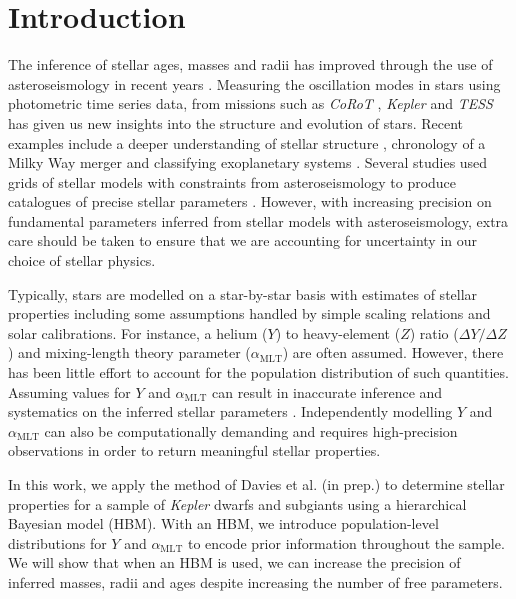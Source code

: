 \documentclass[a4paper,fleqn,usenatbib]{mnras}
\newcommand{\mlt}{\ensuremath{{\alpha_\mathrm{MLT}}}}
\begin{document}


\section{Introduction}

The inference of stellar ages, masses and radii has improved through the use of asteroseismology in recent years \citep[e.g. see the review by][]{Chaplin.Miglio2013}. Measuring the oscillation modes in stars using photometric time series data, from missions such as \emph{CoRoT} \citep{Baglin.Auvergne.ea2006}, \emph{Kepler} \citep{Borucki.Koch.ea2010} and \emph{TESS} \citep{Ricker.Winn.ea2015} has given us new insights into the structure and evolution of stars. Recent examples include a deeper understanding of stellar structure \citep{Verma.Raodeo.ea2017}, chronology of a Milky Way merger \citep{Chaplin.Serenelli.ea2020} and classifying exoplanetary systems \citep{Huber.Chaplin.ea2019}. Several studies used grids of stellar models with constraints from asteroseismology to produce catalogues of precise stellar parameters \citep{Pinsonneault.Elsworth.ea2014, SilvaAguirre.Lund.ea2017}. However, with increasing precision on fundamental parameters inferred from stellar models with asteroseismology, extra care should be taken to ensure that we are accounting for uncertainty in our choice of stellar physics.

Typically, stars are modelled on a star-by-star basis with estimates of stellar properties including some assumptions handled by simple scaling relations and solar calibrations. %
For instance, a helium ($Y$) to heavy-element ($Z$) ratio ($\Delta Y / \Delta Z$) and mixing-length theory parameter ($\mlt$) are often assumed. However, there has been little effort to account for the population distribution of such quantities. Assuming values for $Y$ and $\mlt$ can result in inaccurate inference and systematics on the inferred stellar parameters \citep{Valle.DellOmodarme.ea2015}. Independently modelling $Y$ and $\mlt$ can also be computationally demanding and requires high-precision observations in order to return meaningful stellar properties.

In this work, we apply the method of Davies et al. (in prep.) to determine stellar properties for a sample of \emph{Kepler} dwarfs and subgiants using a hierarchical Bayesian model (HBM). With an HBM, we introduce population-level distributions for $Y$ and $\mlt$ to encode prior information throughout the sample. We will show that when an HBM is used, we can increase the precision of inferred masses, radii and ages despite increasing the number of free parameters.
\end{document}
